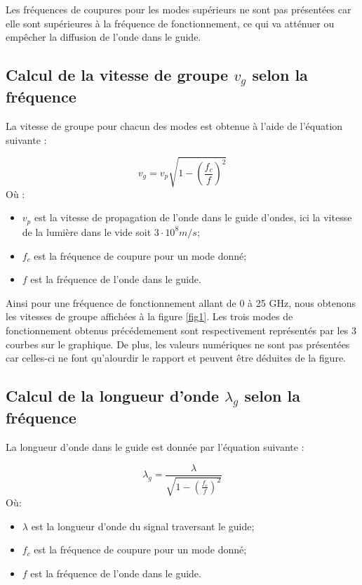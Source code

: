 Les fréquences de coupures pour les modes supérieurs ne sont pas présentées car elle sont supérieures à la fréquence de fonctionnement, ce qui va atténuer ou empêcher la diffusion de l'onde dans le guide.

\subsection{Calcul de la vitesse de groupe $v_g$ selon la fréquence}
La vitesse de groupe pour chacun des modes est obtenue à l'aide de l'équation suivante :

\begin{equation}
	v_g = v_p\sqrt{1-\left(\frac{f_c}{f}\right)^2}
\end{equation}
Où :
\begin{itemize}
	\item $v_p$ est la vitesse de propagation de l'onde dans le guide d'ondes, ici la vitesse de la lumière dans le vide soit $3\cdot10^8m/s$;
	\item $f_c$ est la fréquence de coupure pour un mode donné;
	\item $f$ est la fréquence de l'onde dans le guide.
\end{itemize}


Ainsi pour une fréquence de fonctionnement allant de 0 à 25 GHz, nous obtenons les vitesses de groupe affichées à la figure \ref{fig1}. Les trois modes de fonctionnement obtenus précédemement sont respectivement représentés par les 3 courbes sur le graphique. De plus, les valeurs numériques ne sont pas présentées car celles-ci ne font qu'alourdir le rapport et peuvent être déduites de la figure.

\subsection{Calcul de la longueur d'onde $\lambda_g$ selon la fréquence}
La longueur d'onde dans le guide est donnée par l'équation suivante :

\begin{equation}
	\lambda_g = \frac{\lambda}{\sqrt{1-\left(\frac{f_c}{f}\right)^2}}
\end{equation}
Où:
\begin{itemize}
	\item $\lambda$ est la longueur d'onde du signal traversant le guide; 
	\item $f_c$ est la fréquence de coupure pour un mode donné;
	\item $f$ est la fréquence de l'onde dans le guide.
\end{itemize}


